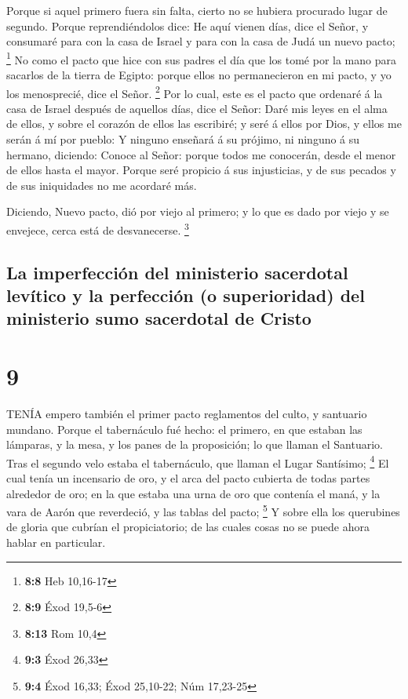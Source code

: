  Porque si aquel primero fuera sin falta, cierto no se
hubiera procurado lugar de segundo.  Porque reprendiéndolos
dice: He aquí vienen días, dice el Señor, y consumaré para con la casa
de Israel y para con la casa de Judá un nuevo pacto; \footnote{\textbf{8:8}
  Heb 10,16-17}  No como el pacto que hice con sus padres el
día que los tomé por la mano para sacarlos de la tierra de Egipto:
porque ellos no permanecieron en mi pacto, y yo los menosprecié, dice el
Señor. \footnote{\textbf{8:9} Éxod 19,5-6}  Por lo cual,
este es el pacto que ordenaré á la casa de Israel después de aquellos
días, dice el Señor: Daré mis leyes en el alma de ellos, y sobre el
corazón de ellos las escribiré; y seré á ellos por Dios, y ellos me
serán á mí por pueblo:  Y ninguno enseñará á su prójimo, ni
ninguno á su hermano, diciendo: Conoce al Señor: porque todos me
conocerán, desde el menor de ellos hasta el mayor.  Porque
seré propicio á sus injusticias, y de sus pecados y de sus iniquidades
no me acordaré más.

 Diciendo, Nuevo pacto, dió por viejo al primero; y lo que
es dado por viejo y se envejece, cerca está de desvanecerse. \footnote{\textbf{8:13}
  Rom 10,4}

\hypertarget{la-imperfecciuxf3n-del-ministerio-sacerdotal-levuxedtico-y-la-perfecciuxf3n-o-superioridad-del-ministerio-sumo-sacerdotal-de-cristo}{%
\subsection{La imperfección del ministerio sacerdotal levítico y la
perfección (o superioridad) del ministerio sumo sacerdotal de
Cristo}\label{la-imperfecciuxf3n-del-ministerio-sacerdotal-levuxedtico-y-la-perfecciuxf3n-o-superioridad-del-ministerio-sumo-sacerdotal-de-cristo}}

\hypertarget{section-8}{%
\section{9}\label{section-8}}

 TENÍA empero también el primer pacto reglamentos del culto,
y santuario mundano.  Porque el tabernáculo fué hecho: el
primero, en que estaban las lámparas, y la mesa, y los panes de la
proposición; lo que llaman el Santuario.  Tras el segundo
velo estaba el tabernáculo, que llaman el Lugar Santísimo; \footnote{\textbf{9:3}
  Éxod 26,33}  El cual tenía un incensario de oro, y el arca
del pacto cubierta de todas partes alrededor de oro; en la que estaba
una urna de oro que contenía el maná, y la vara de Aarón que reverdeció,
y las tablas del pacto; \footnote{\textbf{9:4} Éxod 16,33; Éxod
  25,10-22; Núm 17,23-25}  Y sobre ella los querubines de
gloria que cubrían el propiciatorio; de las cuales cosas no se puede
ahora hablar en particular.


